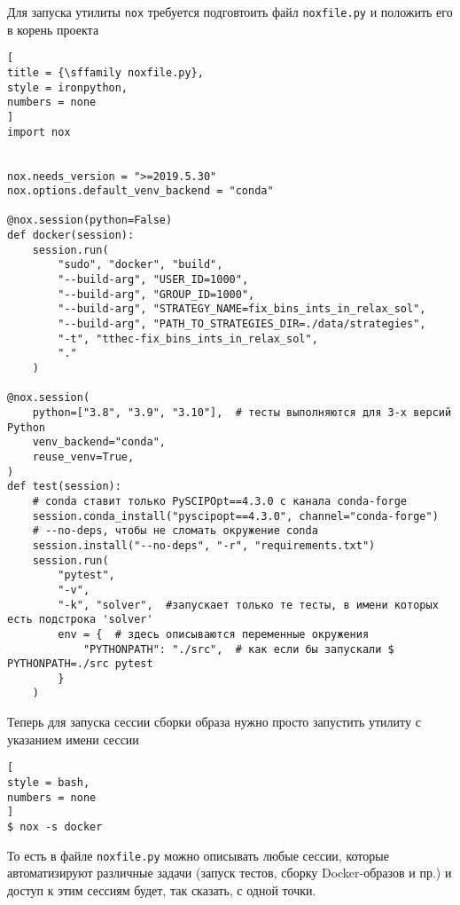 \documentclass[%
	11pt,
	a4paper,
	utf8,
		]{article}
\begin{document}
Для запуска утилиты \verb|nox| требуется подговтоить файл \verb|noxfile.py| и положить его в корень проекта
\begin{lstlisting}[
title = {\sffamily noxfile.py},
style = ironpython,
numbers = none	
]
import nox


nox.needs_version = ">=2019.5.30"
nox.options.default_venv_backend = "conda"

@nox.session(python=False)
def docker(session):
	session.run(
		"sudo", "docker", "build",
		"--build-arg", "USER_ID=1000",
		"--build-arg", "GROUP_ID=1000",
		"--build-arg", "STRATEGY_NAME=fix_bins_ints_in_relax_sol",
		"--build-arg", "PATH_TO_STRATEGIES_DIR=./data/strategies",
		"-t", "tthec-fix_bins_ints_in_relax_sol",
		"."
	)

@nox.session(
    python=["3.8", "3.9", "3.10"],  # тесты выполняются для 3-х версий Python
    venv_backend="conda",
    reuse_venv=True,
)
def test(session):
    # conda ставит только PySCIPOpt==4.3.0 с канала conda-forge
    session.conda_install("pyscipopt==4.3.0", channel="conda-forge")
    # --no-deps, чтобы не сломать окружение conda
    session.install("--no-deps", "-r", "requirements.txt")
    session.run(
        "pytest",
        "-v",
        "-k", "solver",  #запускает только те тесты, в имени которых есть подстрока 'solver'
        env = {  # здесь описываются переменные окружения
            "PYTHONPATH": "./src",  # как если бы запускали $ PYTHONPATH=./src pytest
        }
    )
\end{lstlisting}

Теперь для запуска сессии сборки образа нужно просто запустить утилиту с указанием имени сессии
\begin{lstlisting}[
style = bash,
numbers = none
]
$ nox -s docker
\end{lstlisting}

То есть в файле \verb|noxfile.py| можно описывать любые сессии, которые автоматизируют различные задачи (запуск тестов, сборку Docker-образов и пр.) и доступ к этим сессиям будет, так сказать, с одной точки.
\end{document}
